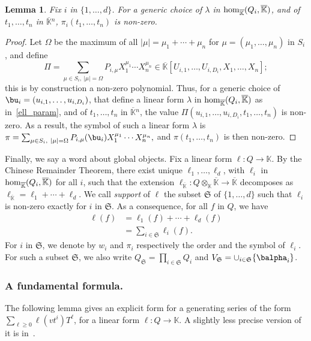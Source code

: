 \documentclass[12pt]{article}
\newtheorem{Lemma}{Lemma}
\def\K {\ensuremath{\mathbb{K}}}
\def\Kbar {{\ensuremath{\overline{\mathbb{K}}}}}
\def\K{\mathbb{K}}
\begin{document}
\begin{Lemma}\label{lemma:symbol0}
	Fix $i$ in $\{1,\dots,d\}$. For a generic choice of $\lambda$ in ${\rm
		hom}_\Kbar(Q_i,\Kbar)$, and of $t_1,\dots,t_n$ in $\Kbar{}^n$,
	$\pi_i(t_1,\dots,t_n)$ is non-zero.
\end{Lemma}
\begin{proof}
	Let $\Omega$ be the maximum of all $|\mu|=\mu_1+\cdots+\mu_n$ for
	$\mu=(\mu_1,\dots,\mu_n)$ in $S_i$, and define 
	$$\Pi =\sum_{\mu \in S_i,\ |\mu|=\Omega}P_{i,\mu} X_1^{\mu_1} \cdots
	X_n^{\mu_n} \in \Kbar[U_{i,1},\dots,U_{i,D_i},X_1,\dots,X_n];$$ this
	is by construction a non-zero polynomial.  Thus, for a generic
	choice of $\bu_i=(u_{i,1},\dots,u_{i,D_i})$, that define a linear form
	$\lambda$ in ${\rm hom}_\Kbar(Q_i,\Kbar)$ as in~\eqref{ell_param},
	and of $t_1,\dots,t_n$ in $\Kbar{}^n$, the value
	$\Pi(u_{i,1},\dots,u_{i,D_i},t_1,\dots,t_n)$ is non-zero. As a
	result, the symbol of such a linear form $\lambda$ is $\pi =\sum_{\mu \in
		S_i,\ |\mu|=\Omega}P_{i,\mu}(\bu_i) X_1^{\mu_1} \cdots X_n^{\mu_n},$
	and $\pi(t_1,\dots,t_n)$ is then non-zero.
\end{proof}



Finally, we say a word about global objects.  Fix a linear form $\ell:
Q \to \K$. By the Chinese Remainder Theorem, there exist unique
$\ell_1,\dots,\ell_d$, with $\ell_i$ in ${\rm hom}_\Kbar(Q_i,\Kbar)$
for all $i$, such that the extension $\ell_\Kbar: Q\otimes_\K \Kbar
\to \Kbar$ decomposes as $\ell_\Kbar = \ell_1 + \cdots + \ell_d$. We
call {\em support} of $\ell$ the subset $\mathfrak{S}$ of
$\{1,\dots,d\}$ such that $\ell_i$ is non-zero exactly for $i$ in
$\mathfrak{S}$.  As a consequence, for all $f$ in $Q$, we have
\begin{align}\label{eq:fui}
\ell(f) &= \ell_1(f) + \cdots + \ell_d(f)\nonumber\\
&=  \sum_{i \in \mathfrak{S}} \ell_i(f).
\end{align}
For $i$ in $\mathfrak{S}$, we denote by $w_i$ and $\pi_i$ respectively
the order and the symbol of $\ell_i$. For such a subset
$\mathfrak{S}$, we also write $Q_\mathfrak{S}=\prod_{i \in
	\mathfrak{S}} Q_i$ and $V_\mathfrak{S}=\cup_{i \in \mathfrak{S}}
\{\balpha_i\}$.


\subsubsection{A fundamental formula.}  The following lemma 
gives an explicit form for a generating series of the form $\sum_{\ell
	\ge 0} \ell(v t^i)T^\ell$, for a linear form $\ell:Q \to \K$. A
slightly less precise version of it is in~\cite{BoSaSc03}.
\end{document}
